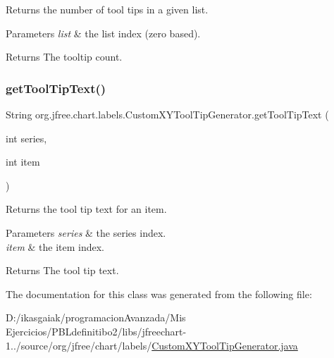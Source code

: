 Returns the number of tool tips in a given list.


\begin{DoxyParams}{Parameters}
{\em list} & the list index (zero based).\\
\hline
\end{DoxyParams}
\begin{DoxyReturn}{Returns}
The tooltip count. 
\end{DoxyReturn}
\mbox{\label{classorg_1_1jfree_1_1chart_1_1labels_1_1_custom_x_y_tool_tip_generator_aa12add02fc717cd599401eb5d9413eb8}} 
\subsubsection{\texorpdfstring{get\+Tool\+Tip\+Text()}{getToolTipText()}}
{\footnotesize\ttfamily String org.\+jfree.\+chart.\+labels.\+Custom\+X\+Y\+Tool\+Tip\+Generator.\+get\+Tool\+Tip\+Text (\begin{DoxyParamCaption}\item[{int}]{series,  }\item[{int}]{item }\end{DoxyParamCaption})}

Returns the tool tip text for an item.


\begin{DoxyParams}{Parameters}
{\em series} & the series index. \\
\hline
{\em item} & the item index.\\
\hline
\end{DoxyParams}
\begin{DoxyReturn}{Returns}
The tool tip text. 
\end{DoxyReturn}


The documentation for this class was generated from the following file\+:\begin{DoxyCompactItemize}
\item 
D\+:/ikasgaiak/programacion\+Avanzada/\+Mis Ejercicios/\+P\+B\+Ldefinitibo2/libs/jfreechart-\/1../source/org/jfree/chart/labels/\mbox{\hyperlink{_custom_x_y_tool_tip_generator_8java}{Custom\+X\+Y\+Tool\+Tip\+Generator.\+java}}\end{DoxyCompactItemize}
